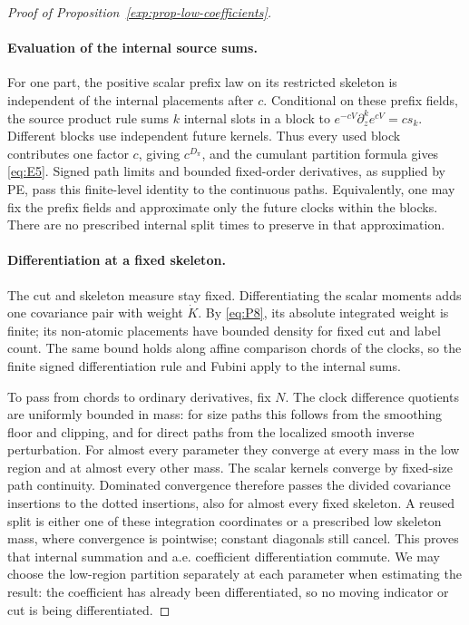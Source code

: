 \begin{proof}[Proof of Proposition~\ref{exp:prop-low-coefficients}]
\paragraph{Evaluation of the internal source sums.}
For one part, the positive scalar prefix law on its restricted
skeleton is independent of the internal placements after \(c\).
Conditional on these prefix fields, the source product rule sums
\(k\) internal slots in a block to
\(e^{-cV}\partial_z^k e^{cV}=c s_k\). Different blocks use independent
future kernels. Thus every used block contributes one factor \(c\),
giving \(c^{D_\pi}\), and the cumulant partition formula gives
\eqref{eq:E5}. Signed path limits and bounded fixed-order derivatives,
as supplied by PE, pass this finite-level identity to the continuous
paths. Equivalently, one may fix the prefix fields and approximate
only the future clocks within the blocks. There are no prescribed
internal split times to preserve in that approximation.

\paragraph{Differentiation at a fixed skeleton.}
The cut and skeleton measure stay fixed. Differentiating the scalar
moments adds one covariance pair with weight \(\dot K\). By
\eqref{eq:P8}, its absolute integrated weight is finite; its
non-atomic placements have bounded density for fixed cut and label
count. The same bound holds along affine comparison chords of the
clocks, so the finite signed differentiation rule and Fubini apply
to the internal sums.

To pass from chords to ordinary derivatives, fix \(N\). The
clock difference quotients are uniformly bounded in mass: for size
paths this follows from the smoothing floor and clipping, and for
direct paths from the localized smooth inverse perturbation. For
almost every parameter they converge at every mass in the low
region and at almost every other mass. The scalar kernels converge
by fixed-size path continuity. Dominated convergence therefore
passes the divided covariance insertions to the dotted insertions,
also for almost every fixed skeleton. A reused split is either one
of these integration coordinates or a prescribed low skeleton mass,
where convergence is pointwise; constant diagonals still cancel.
This proves that internal summation and a.e. coefficient
differentiation commute. We may choose the low-region partition
separately at each parameter when estimating the result: the
coefficient has already been differentiated, so no moving indicator
or cut is being differentiated.


\end{proof}

